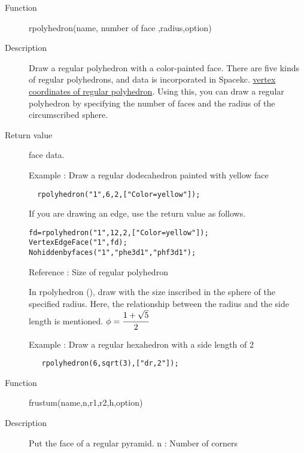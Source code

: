 \documentclass[papersize,a4paper,12pt]{article}
\begin{document}
\begin{description}

\hypertarget{rpolyhedron}{}
\item[Function] rpolyhedron(name, number of face ,radius,option)
\item[Description] Draw a regular polyhedron with a color-painted face.
There are five kinds of regular polyhedrons, and data is incorporated in Spacekc. \hyperlink {rpolydata} {vertex coordinates of regular polyhedron}. Using this, you can draw a regular polyhedron by specifying the number of faces and the radius of the circumscribed sphere.
\item[Return value] face data.

\vspace{\baselineskip}
 Example : Draw a regular dodecahedron painted with yellow face

\verb|  rpolyhedron("1",6,2,["Color=yellow"]);| 

\hspace{20mm}

If you are drawing an edge, use the return value as follows.
\begin{verbatim}
fd=rpolyhedron("1",12,2,["Color=yellow"]);
VertexEdgeFace("1",fd);
Nohiddenbyfaces("1","phe3d1","phf3d1");
\end{verbatim}


\vspace{\baselineskip}
Reference : Size of regular polyhedron

In rpolyhedron (), draw with the size inscribed in the sphere of the specified radius. Here, the relationship between the radius and the side length is mentioned. $\phi=\cfrac{1+\sqrt{5}}{2}$ 

     

Example : Draw a regular hexahedron with a side length of 2
\begin{verbatim}
   rpolyhedron(6,sqrt(3),["dr,2"]); 
\end{verbatim}



\hypertarget{rfrustum}{}
\item[Function] frustum(name,n,r1,r2,h,option)
\item[Description] Put the face of a regular pyramid.
n : Number of corners


\end{description}
\end{document}
